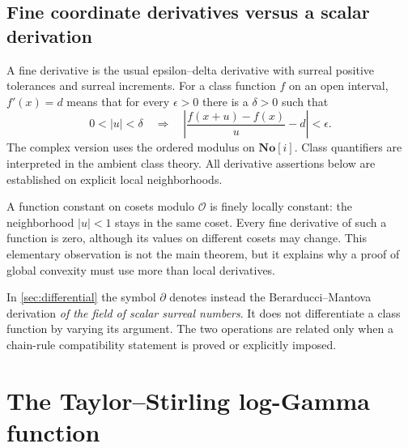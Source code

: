 \documentclass[11pt,letterpaper]{article}
\numberwithin{equation}{section}
\theoremstyle{plain}
\theoremstyle{definition}
\theoremstyle{remark}
\newcommand{\SC}{\mathbf{No}[i]}
\newcommand{\Ocal}{\mathcal O}
\newcommand{\der}{\partial}
\newcommand{\abs}[1]{\lvert#1\rvert}
\begin{document}
\subsection{Fine coordinate derivatives versus a scalar derivation}
A fine derivative is the usual epsilon--delta derivative with surreal
positive tolerances and surreal increments. For a class function $f$ on an
open interval, $f'(x)=d$ means that for every $\epsilon>0$ there is a
$\delta>0$ such that
\[
 0<\abs{u}<\delta\quad\Longrightarrow\quad
 \left|\frac{f(x+u)-f(x)}u-d\right|<\epsilon.
\]
The complex version uses the ordered modulus on $\SC$. Class quantifiers
are interpreted in the ambient class theory. All derivative assertions below
are established on explicit local neighborhoods.

A function constant on cosets modulo $\Ocal$ is finely locally constant:
the neighborhood $\abs{u}<1$ stays in the same coset. Every fine derivative
of such a function is zero, although its values on different cosets may
change. This elementary observation is not the main theorem, but it explains
why a proof of global convexity must use more than local derivatives.

In \cref{sec:differential} the symbol $\der$ denotes instead the
Berarducci--Mantova derivation \emph{of the field of scalar surreal numbers}.
It does not differentiate a class function by varying its argument. The two
operations are related only when a chain-rule compatibility statement is
proved or explicitly imposed.

\section{The Taylor--Stirling log-Gamma function}\label{sec:baseline}
\end{document}
